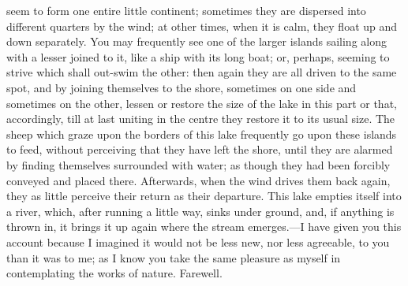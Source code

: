 seem to form one entire little continent; sometimes they are dispersed
into different quarters by the wind; at other times, when it is calm, they
float up and down separately. You may frequently see one of the larger
islands sailing along with a lesser joined to it, like a ship with its
long boat; or, perhaps, seeming to strive which shall out-swim the other:
then again they are all driven to the same spot, and by joining themselves
to the shore, sometimes on one side and sometimes on the other, lessen or
restore the size of the lake in this part or that, accordingly, till at
last uniting in the centre they restore it to its usual size. The sheep
which graze upon the borders of this lake frequently go upon these islands
to feed, without perceiving that they have left the shore, until they are
alarmed by finding themselves surrounded with water; as though they had
been forcibly conveyed and placed there. Afterwards, when the wind drives
them back again, they as little perceive their return as their departure.
This lake empties itself into a river, which, after running a little way,
sinks under ground, and, if anything is thrown in, it brings it up again
where the stream emerges.—I have given you this account because I
imagined it would not be less new, nor less agreeable, to you than it was
to me; as I know you take the same pleasure as myself in contemplating the
works of nature. Farewell.


